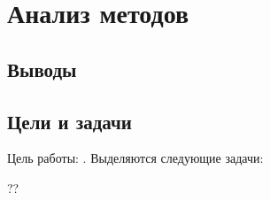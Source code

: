 \chapter{Анализ методов}\label{Chapter:Analysis}

\section{Выводы}\label{Section:Analysis:Conclusion} 

\section{Цели и задачи}

Цель работы: . Выделяются следующие задачи:
\begin{compactenum}
    \item ??
\end{compactenum}
